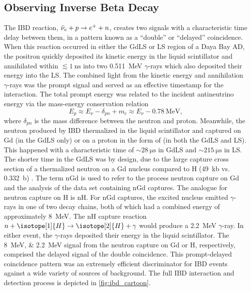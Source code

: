 \subsection{Observing Inverse Beta Decay}
\label{subsec:ibd_intro}

The IBD reaction, $\bar{\nu}_e + p \to e^+ + n$,
creates two signals with a characteristic
time delay between them, in a pattern known as a ``double''
or ``delayed'' coincidence.
When this reaction occurred in either the GdLS or LS region
of a Daya Bay AD,
the positron quickly deposited its kinetic energy in the liquid scintillator
and annihilated within $\lesssim\SI{1}{\nano\second}$
into two \SI{0.511}{\MeV} $\gamma$-rays
which also deposited their energy into the LS.
The combined light from the kinetic energy and annihilation $\gamma$-rays
was the prompt signal
and served as an effective timestamp for the interaction.
The total prompt energy was related to the incident antineutrino energy
via the mass-energy conservation relation
\begin{equation}\label{eq:prompt_vs_nu_energy}
    E_p \approx E_\nu - \delta_{pn} + m_e \approx E_\nu - \SI{0.78}{\MeV},
\end{equation}
where $\delta_{pn}$ is the mass difference between the neutron and proton.
Meanwhile, the neutron produced by IBD thermalized in the liquid scintillator
and captured on Gd (in the GdLS only) or on a proton in the form of 
(in both the GdLS and LS).
This happened with a characteristic time of $\sim \SI{28}{\micro\second}$
in GdLS and $\sim \SI{215}{\micro\second}$ in LS.
The shorter time in the GdLS was by design,
due to the large capture cross section of a thermalized neutron
on a Gd nucleus compared to H (\SI{49}{\kilo\barn} vs. \SI{0.332}{\barn})
\cite{gdls2014}.
The term nGd is used to refer to the process neutron capture on Gd
and the analysis of the data set containing nGd captures.
The analogue for neutron capture on H is nH.
For nGd captures, the excited nucleus
emitted $\gamma$-rays in one of two decay chains,
both of which had a combined energy of approximately \SI{8}{\MeV}.
The nH capture reaction $n+\isotope[1]{H} \to \isotope[2]{H} + \gamma$
would produce a \SI{2.2}{\MeV} $\gamma$-ray.
In either event, the $\gamma$-rays deposited their energy
in the liquid scintillator.
The \SIlist[list-pair-separator = { or }]{8;2.2}{\MeV} signal
from the neutron capture on Gd or H, respectively, comprised the delayed signal of the
double coincidence.
This prompt-delayed coincidence pattern was an extremely efficient
discriminator for IBD events against a wide variety of sources of background.
The full IBD interaction and detection process
is depicted in \cref{fig:ibd_cartoon}.

